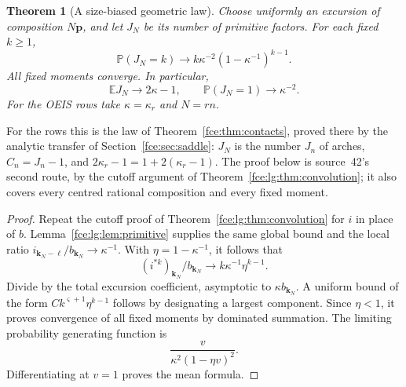 \documentclass[11pt,a4paper]{article}
\numberwithin{equation}{section}
\newtheorem{theorem}{Theorem}[section]
\theoremstyle{definition}\newtheorem{definition}[theorem]{Definition}
\theoremstyle{remark}\newtheorem{remark}[theorem]{Remark}
\newcommand{\Prob}{\mathbb P}
\newcommand{\Exp}{\mathbb E}
\begin{document}
\begin{theorem}[A size-biased geometric law]\label{fce:lg:thm:K}
Choose uniformly an excursion of composition $N\boldsymbol p$, and let $J_N$
be its number of primitive factors. For each fixed $k\ge1$,
\begin{equation}\label{fce:lg:eq:Klaw}
 \Prob(J_N=k)\longrightarrow
 k\kappa^{-2}(1-\kappa^{-1})^{k-1}.
\end{equation}
All fixed moments converge. In particular,
\begin{equation}\label{fce:lg:eq:Kmoments}
 \Exp J_N\longrightarrow2\kappa-1,\qquad
 \Prob(J_N=1)\longrightarrow \kappa^{-2}.
\end{equation}
For the OEIS rows take $\kappa=\kappa_r$ and $N=rn$.
\end{theorem}
For the rows this is the law of Theorem~\ref{fce:thm:contacts}, proved
there by the analytic transfer of Section~\ref{fce:sec:saddle}: $J_N$ is
the number $J_n$ of arches, $C_n=J_n-1$, and $2\kappa_r-1=1+2(\kappa_r-1)$.
The proof below is source~42's second route, by the cutoff argument of
Theorem~\ref{fce:lg:thm:convolution}; it also covers every centred
rational composition and every fixed moment.
\begin{proof}
Repeat the cutoff proof of Theorem~\ref{fce:lg:thm:convolution} for $i$ in
place of $b$. Lemma~\ref{fce:lg:lem:primitive} supplies the same global
bound and the local ratio
$i_{\boldsymbol k_N-\boldsymbol\ell}/b_{\boldsymbol k_N}\to \kappa^{-1}$.
With $\eta=1-\kappa^{-1}$, it follows that
\[
 (i^{*k})_{\boldsymbol k_N}/b_{\boldsymbol k_N}\longrightarrow k\kappa^{-1}\eta^{k-1}.
\]
Divide by the total excursion coefficient, asymptotic to
$\kappa b_{\boldsymbol k_N}$. A uniform bound of the form
$Ck^{\varsigma+1}\eta^{k-1}$ follows by designating a largest component.
Since $\eta<1$, it proves convergence of all fixed moments by dominated
summation. The limiting probability generating function is
\begin{equation}\label{fce:lg:eq:Kpgf}
 \frac{v}{\kappa^2(1-\eta v)^2}.
\end{equation}
Differentiating at $v=1$ proves the mean formula.
\end{proof}
\end{document}
